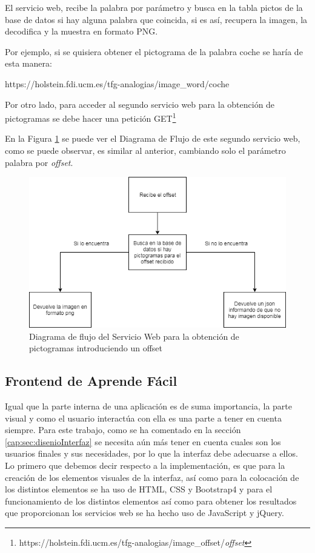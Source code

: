 El servicio web, recibe la palabra por parámetro y busca en la tabla pictos de la base de datos si hay alguna palabra que coincida, si es así, recupera la imagen, la decodifica y la muestra en formato PNG.

Por ejemplo, si se quisiera obtener el pictograma de la palabra coche se haría de esta manera:

https://holstein.fdi.ucm.es/tfg-analogias/image\_word/coche


Por otro lado, para acceder al segundo servicio web para la obtención de pictogramas se debe hacer una petición GET\footnote{https://holstein.fdi.ucm.es/tfg-analogias/image\_offset/\textit{offset}} 



En la Figura \ref{fig:swpictos_offset} se puede ver el Diagrama de Flujo de este segundo servicio web, como se puede observar, es similar al anterior, cambiando solo el parámetro palabra por \textit{offset}.

\begin{figure}[!h]
	\includegraphics[width=.9\textwidth]{Imagenes/Bitmap/Capitulo4/ServiciosWeb/pictoOffset.png}
	\centering
	\caption{Diagrama de flujo del Servicio Web para la obtención de pictogramas introduciendo un offset}
	\label{fig:swpictos_offset}
\end{figure}


\subsection{Frontend de Aprende Fácil}
\label{cap:subsec:frontendapp}
Igual que la parte interna de una aplicación es de suma importancia, la parte visual y como el usuario interactúa con ella es una parte a tener en cuenta siempre. Para este trabajo, como se ha comentado en la sección \ref{cap:sec:disenioInterfaz}  se necesita aún más tener en cuenta cuales son los usuarios finales y sus necesidades, por lo que la interfaz debe adecuarse a ellos.
Lo primero que debemos decir respecto a la implementación, es que para la creación de los elementos visuales de la interfaz, así como para la colocación de los distintos elementos se ha uso de HTML, CSS y Bootstrap4 y para el funcionamiento de los distintos elementos así como para obtener los resultados que proporcionan los servicios web se ha hecho uso de JavaScript y jQuery.


